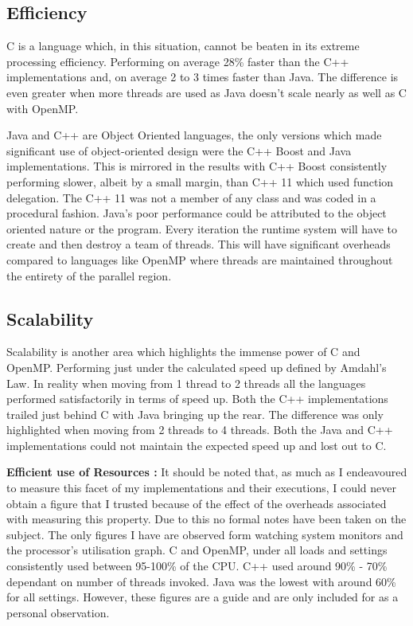 \documentclass[11pt]{article} %
\begin{document}
\subsection{Efficiency}
C is a language which, in this situation, cannot be beaten in its extreme processing efficiency. Performing on average 28\% faster than the C++ implementations and, on average 2 to 3 times faster than Java. The difference is even greater when more threads are used as Java doesn't scale nearly as well as C with OpenMP. 

Java and C++ are Object Oriented languages, the only versions which made significant use of object-oriented design were the C++ Boost and Java implementations. This is mirrored in the results with C++ Boost consistently performing slower, albeit by a small margin, than C++ 11 which used function delegation. The C++ 11 was not a member of any class and was coded in a procedural fashion. Java's poor performance could be attributed to the object oriented nature or the program. Every iteration the runtime system will have to create and then destroy a team of threads. This will have significant overheads compared to languages like OpenMP where threads are maintained throughout the entirety of the parallel region.
\subsection{Scalability}
Scalability is another area which highlights the immense power of C and OpenMP. Performing just under the calculated speed up defined by Amdahl's Law. In reality when moving from 1 thread to 2 threads all the languages performed satisfactorily in terms of speed up. Both the C++ implementations trailed just behind C with Java bringing up the rear. The difference was only highlighted when moving from 2 threads to 4 threads. Both the Java and C++ implementations could not maintain the expected speed up and lost out to C. 
\bigskip
\begin{mdframed}
{\bf Efficient use of Resources :} It should be noted that, as much as I endeavoured to measure this facet of my implementations and their executions, I could never obtain a figure that I trusted because of the effect of the overheads associated with measuring this property. Due to this no formal notes have been taken on the subject. The only figures I have are observed form watching system monitors and the processor's utilisation graph. C and OpenMP, under all loads and settings consistently used between 95-100\% of the CPU. C++ used around 90\% - 70\% dependant on number of threads invoked. Java was the lowest with around 60\% for all settings. However, these figures are a guide and are only included for as a personal observation.
\end{mdframed}
\end{document}
